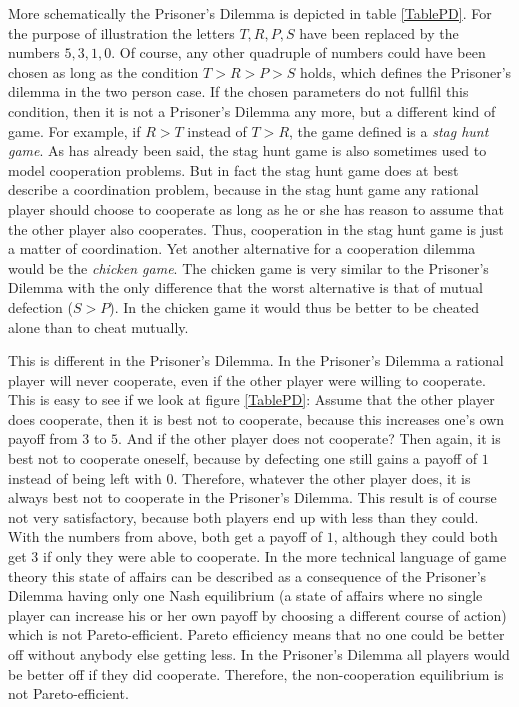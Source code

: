\label{gameTypes}
More schematically the Prisoner's Dilemma is depicted in table \ref{TablePD}.
For the purpose of illustration the letters $T, R, P, S$ have been replaced by
the numbers $5, 3, 1, 0$. Of course, any other quadruple of numbers could have
been chosen as long as the condition $T > R > P > S$ holds, which defines the
Prisoner's dilemma in the two person case. If the chosen parameters do not
fullfil this condition, then it is not a Prisoner's Dilemma any more, but a
different kind of game. For example, if $R > T$ instead of $T > R$, the game
defined is a {\em stag hunt game}. As has already been said, the stag hunt
game is also sometimes used to model cooperation problems. But in fact the
stag hunt game does at best describe a coordination problem, because in the
stag hunt game any rational player should choose to cooperate as long as he or
she has reason to assume that the other player also cooperates. Thus,
cooperation in the stag hunt game is just a matter of coordination. Yet
another alternative for a cooperation dilemma would be the {\em chicken game}.
The chicken game is very similar to the Prisoner's Dilemma with the only
difference that the worst alternative is that of mutual defection ($S > P$).
In the chicken game it would thus be better to be cheated alone than to cheat
mutually.

This is different in the Prisoner's Dilemma. In the Prisoner's Dilemma a
rational player will never cooperate, even if the other player were willing to
cooperate. This is easy to see if we look at figure \ref{TablePD}: Assume that
the other player does cooperate, then it is best not to cooperate, because
this increases one's own payoff from $3$ to $5$. And if the other player does
not cooperate? Then again, it is best not to cooperate oneself, because by
defecting one still gains a payoff of $1$ instead of being left with $0$.
Therefore, whatever the other player does, it is always best not to cooperate
in the Prisoner's Dilemma. This result is of course not very satisfactory,
because both players end up with less than they could. With the numbers from
above, both get a payoff of $1$, although they could both get $3$ if only
they were able to cooperate. In the more technical language of game theory
this state of affairs can be described as a consequence of the Prisoner's
Dilemma having only one Nash equilibrium (a state of affairs where no single
player can increase his or her own payoff by choosing a different course of
action) which is not Pareto-efficient. Pareto efficiency means that
no one could be better off without anybody else getting less. In the
Prisoner's Dilemma all players would be better off if they did cooperate.
Therefore, the non-cooperation equilibrium is not Pareto-efficient.

